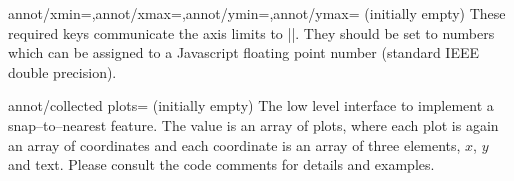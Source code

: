 \begin{pgfplotskeylist}{annot/xmin=,annot/xmax=,annot/ymin=,annot/ymax= (initially empty)}
	These required keys communicate the axis limits to |\pgfplotsclickablecreate|. They should be set to numbers which can be assigned to a Javascript floating point number (standard IEEE double precision).
\end{pgfplotskeylist}

\begin{pgfplotskey}{annot/collected plots= (initially empty)}
	The low level interface to implement a snap--to--nearest feature. The value is an array of plots, where each plot is again an array of coordinates and each coordinate is an array of three elements, $x$, $y$ and text. Please consult the code comments for details and examples.
\end{pgfplotskey}
